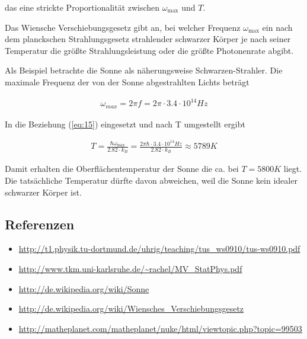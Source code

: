 das eine strickte Proportionalität zwischen \(\omega_{\text{max}}\) und \(T\). 


Das Wiensche Verschiebungsgesetz gibt an, bei welcher Frequenz \(\omega_{\text{max}}\) ein nach dem planckschen Strahlungsgesetz strahlender schwarzer Körper je nach seiner Temperatur die größte Strahlungsleistung oder die größte Photonenrate abgibt.

Als Beispiel betrachte die Sonne als näherungsweise Schwarzen-Strahler. Die maximale Frequenz der von der Sonne abgestrahlten Lichts beträgt

\begin{align}
  \label{eq:14}
  \omega_{max}=2\pi f = 2\pi \cdot 3.4\cdot 10^{14}Hz
\end{align}

In die Beziehung (\ref{eq:15}) eingesetzt und nach T umgestellt ergibt

\begin{align}
  \label{eq:16}
  T = \frac{\hbar \omega_{\text{max}}}{2.82\cdot k_B} =  \frac{2\pi \hbar\cdot 3.4\cdot 10^{14} Hz }{2.82\cdot k_B} \approx 5789 K
\end{align}

Damit erhalten die Oberflächentemperatur der Sonne die ca. bei \(T=5800K\) liegt. Die tatsächliche Temperatur dürfte davon abweichen, weil die Sonne kein idealer schwarzer Körper ist.


\subsection*{Referenzen}
\begin{itemize}
\item \url{http://t1.physik.tu-dortmund.de/uhrig/teaching/tus_ws0910/tus-ws0910.pdf}
\item \url{http://www.tkm.uni-karlsruhe.de/~rachel/MV_StatPhys.pdf}
\item \url{http://de.wikipedia.org/wiki/Sonne}
\item \url{http://de.wikipedia.org/wiki/Wiensches_Verschiebungsgesetz}
\item \url{http://matheplanet.com/matheplanet/nuke/html/viewtopic.php?topic=99503}
\end{itemize}


